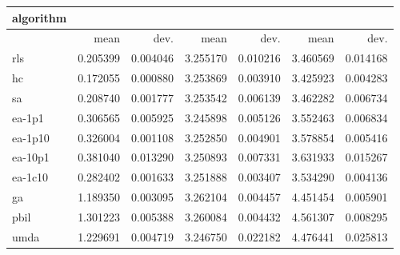 \begin{tabular}{@{}l*{6}{>{{}}N{1}{2}}@{}}
\toprule
{algorithm} &  &  &  \\
\midrule
& {mean} & {dev.} & {mean} & {dev.} & {mean} & {dev.} \\
\midrule
rls & 0.205399 & 0.004046 & 3.255170 & 0.010216 & 3.460569 & 0.014168 \\
 hc & 0.172055 & 0.000880 & 3.253869 & 0.003910 & 3.425923 & 0.004283 \\
 sa & 0.208740 & 0.001777 & 3.253542 & 0.006139 & 3.462282 & 0.006734 \\
 ea-1p1 & 0.306565 & 0.005925 & 3.245898 & 0.005126 & 3.552463 & 0.006834 \\
 ea-1p10 & 0.326004 & 0.001108 & 3.252850 & 0.004901 & 3.578854 & 0.005416 \\
 ea-10p1 & 0.381040 & 0.013290 & 3.250893 & 0.007331 & 3.631933 & 0.015267 \\
 ea-1c10 & 0.282402 & 0.001633 & 3.251888 & 0.003407 & 3.534290 & 0.004136 \\
 ga & 1.189350 & 0.003095 & 3.262104 & 0.004457 & 4.451454 & 0.005901 \\
 pbil & 1.301223 & 0.005388 & 3.260084 & 0.004432 & 4.561307 & 0.008295 \\
 umda & 1.229691 & 0.004719 & 3.246750 & 0.022182 & 4.476441 & 0.025813 \\
 \bottomrule
\end{tabular}
